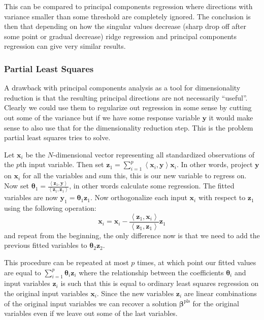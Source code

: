 \documentclass[a4paper, 12pt]{scrartcl}
\newcommand{\bfbeta}{\boldsymbol{\beta}}
\newcommand{\inner}[2]{\left\langle #1, #2 \right\rangle}
\begin{document}
This can be compared to principal components regression where directions with variance smaller than some threshold are completely ignored.
The conclusion is then that depending on how the singular values decrease (sharp drop off after some point or gradual decrease) ridge regression and principal components regression can give very similar results.

\subsubsection*{Partial Least Squares}
A drawback with principal components analysis as a tool for dimensionality reduction is that the resulting principal directions are not necessarily ``useful''.
Clearly we could use them to regularize out regression in some sense by cutting out some of the variance but if we have some response variable $\mathbf{y}$ it would make sense to also use that for the dimensionality reduction step.
This is the problem partial least squares tries to solve.

\begin{algorithm}
	Let $\mathbf{x}_i$ be the $N$-dimensional vector representing all standardized observations of the $p$th input variable.
	Then set $\mathbf{z}_1=\sum_{i=1}^{p}\inner{\mathbf{x}_i}{\mathbf{y}}\mathbf{x}_i$.
	In other words, project $\mathbf{y}$ on $\mathbf{x}_i$ for all the variables and sum this, this is our new variable to regress on.
	Now set $\boldsymbol{\theta}_1=\frac{\inner{\mathbf{z}_1}{\mathbf{y}}}{\inner{\mathbf{z}_1}{\mathbf{z}_1}}$, in other words calculate some regression.
	The fitted variables are now $\mathbf{y}_1=\boldsymbol{\theta}_1\mathbf{z}_1$.
	Now orthogonalize each input $\mathbf{x}_i$ with respect to $\mathbf{z}_1$ using the following operation:
	\begin{equation*}
		\mathbf{x}_i=\mathbf{x}_i-\frac{\inner{\mathbf{z}_1}{\mathbf{x}_i}}{\inner{\mathbf{z}_1}{\mathbf{z}_1}}\mathbf{z}_1
	\end{equation*}
	and repeat from the beginning, the only difference now is that we need to add the previous fitted variables to $\boldsymbol{\theta}_2\mathbf{z}_2$.
	
	This procedure can be repeated at most $p$ times, at which point our fitted values are equal to $\sum_{i=1}^{p}\boldsymbol{\theta}_i\mathbf{z}_i$ where the relationship between the coefficients $\boldsymbol{\theta}_i$ and input variables $\mathbf{z}_i$ is such that this is equal to ordinary least squares regression on the original input variables $\mathbf{x}_i$.
	Since the new variables $\mathbf{z}_i$ are linear combinations of the original input variables we can recover a solution $\bfbeta^\mathrm{pls}$ for the original variables even if we leave out some of the last variables.
\end{algorithm}
\end{document}

